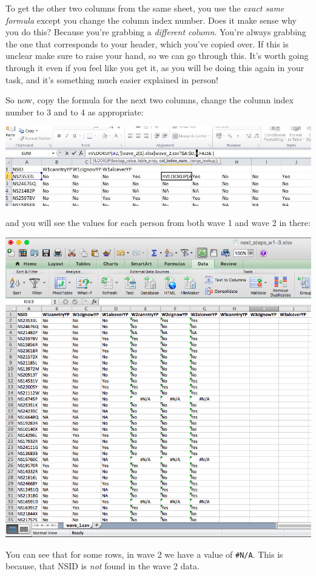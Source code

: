 \documentclass[]{book}
\theoremstyle{definition}
\theoremstyle{definition}
\theoremstyle{definition}
\theoremstyle{remark}
\begin{document}
To get the other two columns from the same sheet, you use the
\emph{exact same formula} except you change the column index number.
Does it make sense why you do this? Because you're grabbing a
\emph{different column}. You're always grabbing the one that corresponds
to your header, which you've copied over. If this is unclear make sure
to raise your hand, so we can go through this. It's worth going through
it even if you feel like you get it, as you will be doing this again in
your task, and it's something much easier explained in person!

So now, copy the formula for the next two columns, change the column
index number to 3 and to 4 as appropriate:

\includegraphics{imgs/VLOOKUP.jpg}

and you will see the values for each person from both wave 1 and wave 2
in there:

\includegraphics{imgs/nas_present.png}

You can see that for some rows, in wave 2 we have a value of
\texttt{\#N/A}. This is because, that NSID is \emph{not} found in the
wave 2 data.
\end{document}
